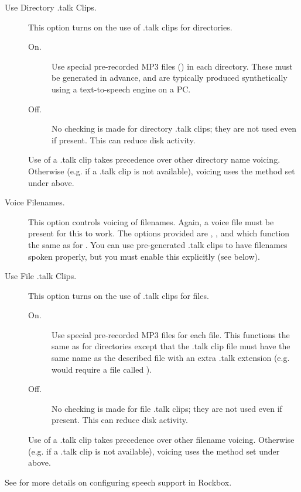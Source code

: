 \begin{description}
  \item[Use Directory .talk Clips.]
    This option turns on the use of .talk clips for directories. 
    \begin{description}
    \item[On.]
      Use special pre-recorded MP3 files () in each 
      directory. These must be generated in advance, and are typically 
      produced synthetically using a text-to-speech engine on a PC.
    \item[Off.]
      No checking is made for directory .talk clips; they are not used even if present.
      This can reduce disk activity.
    \end{description}
    Use of a .talk clip takes precedence over other directory name voicing. Otherwise 
    (e.g. if a .talk clip is not available), voicing uses the method set under 
     above.

  \item[Voice Filenames.]
    This option controls voicing of filenames. Again, a voice file must be present 
    for this to work. The options provided are , , 
    and  which function the same as for .
    You can use pre-generated .talk clips to have filenames spoken properly, but
    you must enable this explicitly (see below).

  \item[Use File .talk Clips.]
    This option turns on the use of .talk clips for files. 
    \begin{description}
    \item[On.]
      Use special pre-recorded MP3 files for each file.
      This functions the same as for directories except that the .talk clip file 
      must have the same name as the described file with an extra .talk extension 
      (e.g.  would require a file called ).
    \item[Off.]
      No checking is made for file .talk clips; they are not used even if present.
      This can reduce disk activity.
    \end{description}
    Use of a .talk clip takes precedence over other filename voicing. Otherwise 
    (e.g. if  a .talk clip is not available), voicing uses the method set under
      above.

  \end{description}

See  for more details on configuring speech support in Rockbox.
